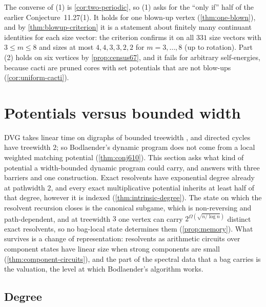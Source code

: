 \documentclass[final]{siamart0516}
\numberwithin{theorem}{section}
\numberwithin{equation}{section}
\theoremstyle{siamnonum}
\theoremstyle{plain}
\begin{document}
The converse of (1) is \cref{cor:two-periodic}, so (1) asks for the ``only if'' half of the earlier Conjecture~11.27(1). It holds for one blown-up vertex (\cref{thm:one-blown}), and by \cref{thm:blowup-criterion} it is a statement about finitely many continuant identities for each size vector: the criterion confirms it on all $331$ size vectors with $3\le m\le8$ and sizes at most $4,4,3,3,2,2$ for $m=3,\dots,8$ (up to rotation). Part (2) holds on six vertices by \cref{prop:census67}, and it fails for arbitrary self-energies, because cacti are pruned cores with set potentials that are not blow-ups (\cref{cor:uniform-cacti}).

\section{Potentials versus bounded width}\label{sec:treewidth}

DVG takes linear time on digraphs of bounded treewidth \cite{Bodlaender}, and directed cycles have treewidth $2$; so Bodlaender's dynamic program does not come from a local weighted matching potential (\cref{thm:conj610}). This section asks what kind of potential a width-bounded dynamic program could carry, and answers with three barriers and one construction. Exact resolvents have exponential degree already at pathwidth $2$, and every exact multiplicative potential inherits at least half of that degree, however it is indexed (\cref{thm:intrinsic-degree}). The state on which the resolvent recursion closes is the canonical subgame, which is non-reversing and path-dependent, and at treewidth $3$ one vertex can carry $2^{\Omega(\sqrt{n/\log n})}$ distinct exact resolvents, so no bag-local state determines them (\cref{prop:memory}). What survives is a change of representation: resolvents as arithmetic circuits over component states have linear size when strong components are small (\cref{thm:component-circuits}), and the part of the spectral data that a bag carries is the valuation, the level at which Bodlaender's algorithm works.

\subsection{Degree}
\end{document}
